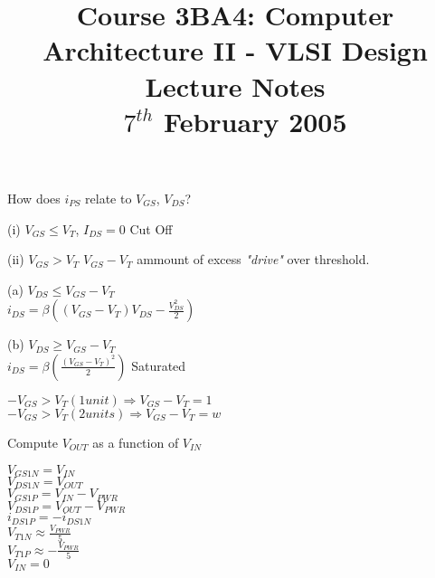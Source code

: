 \documentclass[a4paper,12pt]{article}
\begin{document}
\title{Course 3BA4: Computer Architecture II - VLSI Design \\ Lecture Notes \\ $7^{th}$ February 2005}

\maketitle


How does $i_{PS}$ relate to $V_{GS}$, $V_{DS}$?


(i) $V_{GS} \leq V_{T}$, $I_{DS} = 0$ Cut Off

(ii) $V_{GS} > V_{T}$ $V_{GS} - V_{T}$ ammount of excess \emph{"drive"}
over threshold.

\indent (a) $V_{DS} \leq V_{GS} - V_{T}$ \\ 
$i_{DS} = \beta \left( \left(V_{GS} - V_{T} \right) V_{DS} - \frac{V_{DS}^{2}}{2} 
\right)$

\indent (b) $V_{DS} \geq V_{GS} - V_{T}$ \\
$i_{DS} = \beta \left( \frac{\left( V_{GS} - V_{T} \right)^{2}}{2}
\right)$ Saturated

$-V_{GS} > V_{T} (1 unit) \Rightarrow V_{GS} - V_{T} = 1$ \\

$-V_{GS} > V_{T} (2 units) \Rightarrow V_{GS} - V_{T} = w$ \\


\begin{table}[hbtp]


\caption{Compute $V_{OUT}$ as a function of $V_{IN}$}

\end{table}

$V_{GS1N} = V_{IN}$ \\
$V_{DS1N} = V_{OUT}$ \\
$V_{GS1P} = V_{IN} - V_{PWR}$ \\
$V_{DS1P} = V_{OUT} - V_{PWR}$ \\
$i_{DS1P} = - i_{DS1N}$ \\

$V_{T1N} \approx \frac{V_{PWR}}{5}$ \\

$V_{T1P} \approx - \frac{V_{PWR}}{5}$ \\

$V_{IN} = 0$
\end{document}
